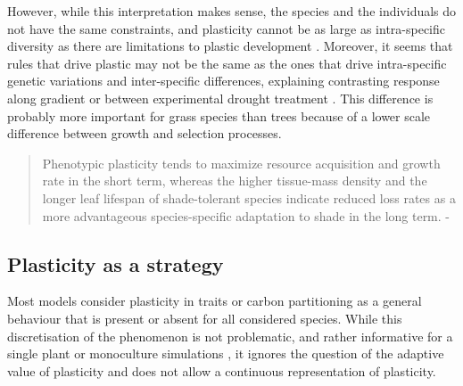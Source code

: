 However, while this interpretation makes sense, the species and the individuals do not have the same constraints, and plasticity cannot be as large as intra-specific diversity as there are limitations to plastic development \parencite{dewitt_costs_1998, auld_re-evaluating_2009}. Moreover, it seems that rules that drive plastic may not be the same as the ones that drive intra-specific genetic variations  and inter-specific differences\parencite{ryser_consequences_2000}, explaining contrasting response along gradient or between experimental drought treatment \parencite{kichenin_contrasting_2013, jung_intraspecific_2014}. This difference is probably more important for grass species than trees \parencite{franklin_modeling_2012} because of a lower scale difference between growth and selection processes.

\begin{quotation}
Phenotypic plasticity tends to maximize resource acquisition and growth rate in the short term, whereas the higher tissue-mass density and the longer leaf lifespan of shade-tolerant species indicate reduced loss rates as a more advantageous species-specific adaptation to shade in the long term. - \citet{ryser_consequences_2000}
\end{quotation}




\subsection{Plasticity as a strategy}

Most models consider plasticity in traits or carbon partitioning as a general behaviour that is present or absent for all considered species. While this discretisation of the phenomenon is not problematic, and rather informative for a single plant or monoculture simulations \parencite{maire_plasticity_2013}, it ignores the question of the adaptive value of plasticity and does not allow a continuous representation of plasticity.

